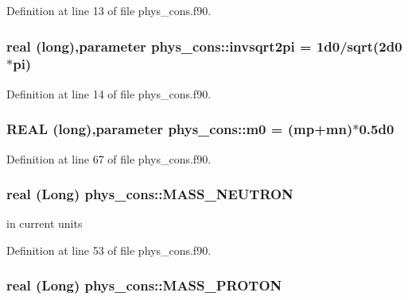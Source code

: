 Definition at line 13 of file phys\_\-cons.f90.

\hypertarget{namespacephys__cons_a369d33713444a99a71f80a74c0652d4e}{
\subsubsection[{invsqrt2pi}]{\setlength{\rightskip}{0pt plus 5cm}real (long),parameter {\bf phys\_\-cons::invsqrt2pi} = 1d0/sqrt(2d0$\ast$pi)}}
\label{namespacephys__cons_a369d33713444a99a71f80a74c0652d4e}


Definition at line 14 of file phys\_\-cons.f90.

\hypertarget{namespacephys__cons_a2e392d52d36b5c1db0d17928aa40f35b}{
\subsubsection[{m0}]{\setlength{\rightskip}{0pt plus 5cm}REAL (long),parameter {\bf phys\_\-cons::m0} = ({\bf mp}+{\bf mn})$\ast$0.5d0}}
\label{namespacephys__cons_a2e392d52d36b5c1db0d17928aa40f35b}


Definition at line 67 of file phys\_\-cons.f90.

\hypertarget{namespacephys__cons_abeff422917cc48601644e90ab12fb7c0}{
\subsubsection[{MASS\_\-NEUTRON}]{\setlength{\rightskip}{0pt plus 5cm}real (Long) {\bf phys\_\-cons::MASS\_\-NEUTRON}}}
\label{namespacephys__cons_abeff422917cc48601644e90ab12fb7c0}


in current units 



Definition at line 53 of file phys\_\-cons.f90.

\hypertarget{namespacephys__cons_a20e8ed3d7ff389588ce024048c5ccf85}{
\subsubsection[{MASS\_\-PROTON}]{\setlength{\rightskip}{0pt plus 5cm}real (Long) {\bf phys\_\-cons::MASS\_\-PROTON}}}
\label{namespacephys__cons_a20e8ed3d7ff389588ce024048c5ccf85}


